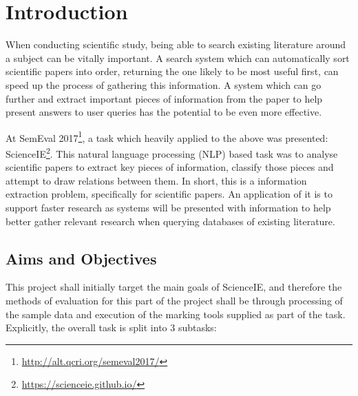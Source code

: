 \chapter{Introduction}

When conducting scientific study, being able to search existing literature around a subject can be vitally important. A search system which can automatically sort scientific papers into order, returning the one likely to be most useful first, can speed up the process of gathering this information. A system which can go further and extract important pieces of information from the paper to help present answers to user queries has the potential to be even more effective.

At SemEval 2017\footnote{\href{http://alt.qcri.org/semeval2017/}{http://alt.qcri.org/semeval2017/}}, a task which heavily applied to the above was presented: ScienceIE\footnote{\href{https://scienceie.github.io/}{https://scienceie.github.io/}}. This natural language processing (NLP) based task was to analyse scientific papers to extract key pieces of information, classify those pieces and attempt to draw relations between them. In short, this is a information extraction problem, specifically for scientific papers. An application of it is to support faster research as systems will be presented with information to help better gather relevant research when querying databases of existing literature.

\section{Aims and Objectives}

This project shall initially target the main goals of ScienceIE, and therefore the methods of evaluation for this part of the project shall be through processing of the sample data and execution of the marking tools supplied as part of the task. Explicitly, the overall task is split into 3 subtasks:

